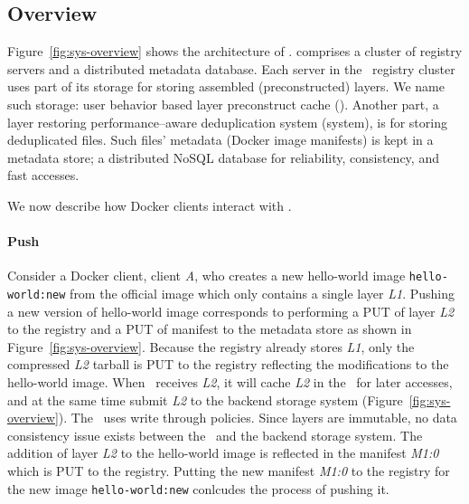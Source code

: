 \vspace{-4pt}
\subsection{Overview}
\label{sec:design}
\vspace{-4pt}



Figure~\ref{fig:sys-overview} shows the architecture of \sysname.
 \sysname comprises a cluster of registry servers and a distributed metadata database. 
Each server in the \sysname~registry cluster uses part of its storage for storing assembled (\ie preconstructed) layers. 
We name such storage: user behavior based layer preconstruct cache (\preconstructcachename).
Another part, a layer restoring performance--aware deduplication system (\dedupname system), is for storing deduplicated files. 
Such files' metadata (\eg Docker image manifests) is kept in a metadata store; a distributed NoSQL database for 
reliability, consistency, and fast accesses.

We now describe how Docker clients interact with \sysname.

\paragraph{Push}

Consider a Docker client, client \textit{A}, who creates a new hello-world image
\texttt{hello-world:new}
from the official image which only contains a single layer \textit{L1}. 
Pushing a new version of hello-world image corresponds to performing a PUT of layer \textit{L2} to the registry and a PUT of manifest to the metadata store as shown in Figure~\ref{fig:sys-overview}. 
Because the registry already stores \textit{L1}, 
only the compressed \textit{L2} tarball is PUT to the registry reflecting the modifications to the hello-world image.
When \sysname~receives \textit{L2}, 
it will cache \textit{L2} in the \preconstructcachename~for later accesses,
and at the same time submit \textit{L2} to the backend storage system (Figure~\ref{fig:sys-overview}).
The \preconstructcachename~uses write through policies. 
Since layers are immutable, no data consistency issue exists between the \preconstructcachename~and the backend storage system.
The addition of layer \textit{L2} to the hello-world image is reflected in the manifest \textit{M1:0} which is PUT to the registry.
Putting the new manifest \textit{M1:0} to the registry for the new image \texttt{hello-world:new} conlcudes the process of pushing it.



